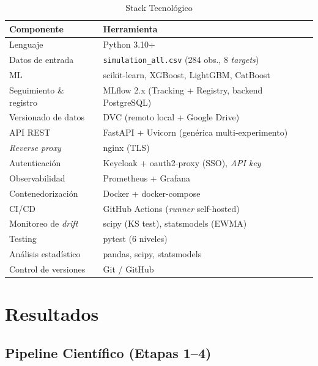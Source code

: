 \documentclass[conference]{IEEEtran}
\begin{document}
\begin{table}[H]
\caption{Stack Tecnológico}
\label{tab:stack}
\centering\small
\begin{tabular}{@{}ll@{}}
\toprule
\textbf{Componente} & \textbf{Herramienta} \\
\midrule
Lenguaje & Python 3.10+ \\
Datos de entrada & \texttt{simulation\_all.csv} (284 obs., 8 \textit{targets}) \\
ML & scikit-learn, XGBoost, LightGBM, CatBoost \\
Seguimiento \& registro & MLflow 2.x (Tracking + Registry, backend PostgreSQL) \\
Versionado de datos & DVC (remoto local + Google Drive) \\
API REST & FastAPI + Uvicorn (genérica multi-experimento) \\
\textit{Reverse proxy} & nginx (TLS) \\
Autenticación & Keycloak + oauth2-proxy (SSO), \textit{API key} \\
Observabilidad & Prometheus + Grafana \\
Contenedorización & Docker + docker-compose \\
CI/CD & GitHub Actions (\textit{runner} self-hosted) \\
Monitoreo de \textit{drift} & scipy (KS test), statsmodels (EWMA) \\
Testing & pytest (6 niveles) \\
Análisis estadístico & pandas, scipy, statsmodels \\
Control de versiones & Git / GitHub \\
\bottomrule
\end{tabular}
\end{table}

\section{Resultados}
\label{sec:resultados}

\subsection{Pipeline Científico (Etapas 1--4)}
\end{document}
